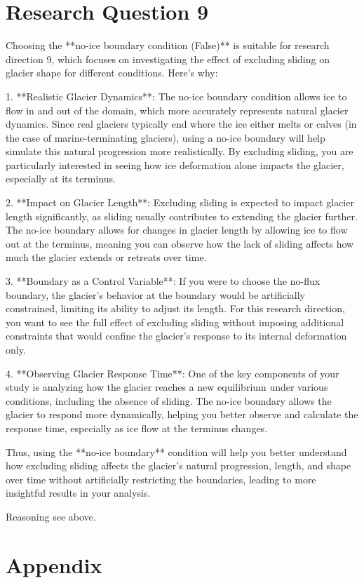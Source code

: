 \documentclass{article}
\begin{document}
\section{Research Question 9}

Choosing the **no-ice boundary condition (False)** is suitable for research direction 9, which focuses on investigating the effect of excluding sliding on glacier shape for different conditions. Here's why:

1. **Realistic Glacier Dynamics**: The no-ice boundary condition allows ice to flow in and out of the domain, which more accurately represents natural glacier dynamics. Since real glaciers typically end where the ice either melts or calves (in the case of marine-terminating glaciers), using a no-ice boundary will help simulate this natural progression more realistically. By excluding sliding, you are particularly interested in seeing how ice deformation alone impacts the glacier, especially at its terminus.

2. **Impact on Glacier Length**: Excluding sliding is expected to impact glacier length significantly, as sliding usually contributes to extending the glacier further. The no-ice boundary allows for changes in glacier length by allowing ice to flow out at the terminus, meaning you can observe how the lack of sliding affects how much the glacier extends or retreats over time.

3. **Boundary as a Control Variable**: If you were to choose the no-flux boundary, the glacier's behavior at the boundary would be artificially constrained, limiting its ability to adjust its length. For this research direction, you want to see the full effect of excluding sliding without imposing additional constraints that would confine the glacier's response to its internal deformation only.

4. **Observing Glacier Response Time**: One of the key components of your study is analyzing how the glacier reaches a new equilibrium under various conditions, including the absence of sliding. The no-ice boundary allows the glacier to respond more dynamically, helping you better observe and calculate the response time, especially as ice flow at the terminus changes.

Thus, using the **no-ice boundary** condition will help you better understand how excluding sliding affects the glacier's natural progression, length, and shape over time without artificially restricting the boundaries, leading to more insightful results in your analysis.


Reasoning see above.





\section*{Appendix}

% 
\end{document}
